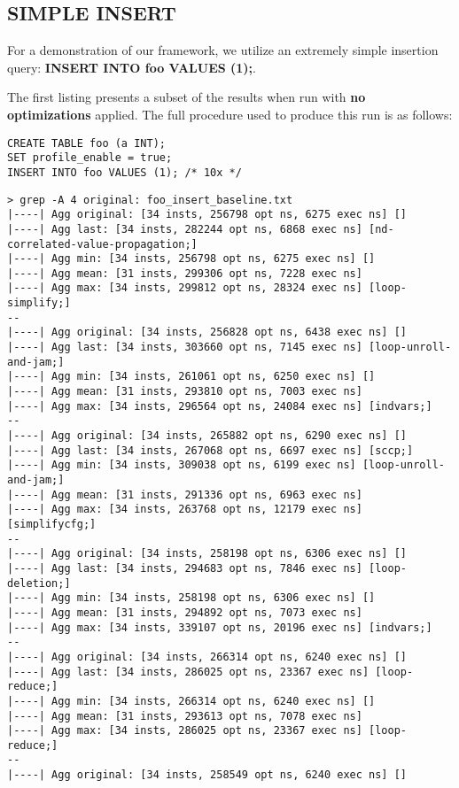 \documentclass{vldb}
\newcommand{\dbCode}[1]{{\sffamily\small \textbf{#1}}\xspace}
\begin{document}
\subsection{SIMPLE INSERT}

For a demonstration of our framework, we utilize an extremely simple insertion query: \dbCode{INSERT INTO foo VALUES (1);}.

The first listing presents a subset of the results when run with \textbf{no optimizations} applied. The full procedure used to produce this run is as follows:
\begin{lstlisting}
CREATE TABLE foo (a INT);
SET profile_enable = true;
INSERT INTO foo VALUES (1); /* 10x */
\end{lstlisting}  

\begin{lstlisting}
> grep -A 4 original: foo_insert_baseline.txt 
|----| Agg original: [34 insts, 256798 opt ns, 6275 exec ns] []
|----| Agg last: [34 insts, 282244 opt ns, 6868 exec ns] [nd-correlated-value-propagation;]
|----| Agg min: [34 insts, 256798 opt ns, 6275 exec ns] []
|----| Agg mean: [31 insts, 299306 opt ns, 7228 exec ns]
|----| Agg max: [34 insts, 299812 opt ns, 28324 exec ns] [loop-simplify;]
--
|----| Agg original: [34 insts, 256828 opt ns, 6438 exec ns] []
|----| Agg last: [34 insts, 303660 opt ns, 7145 exec ns] [loop-unroll-and-jam;]
|----| Agg min: [34 insts, 261061 opt ns, 6250 exec ns] []
|----| Agg mean: [31 insts, 293810 opt ns, 7003 exec ns]
|----| Agg max: [34 insts, 296564 opt ns, 24084 exec ns] [indvars;]
--
|----| Agg original: [34 insts, 265882 opt ns, 6290 exec ns] []
|----| Agg last: [34 insts, 267068 opt ns, 6697 exec ns] [sccp;]
|----| Agg min: [34 insts, 309038 opt ns, 6199 exec ns] [loop-unroll-and-jam;]
|----| Agg mean: [31 insts, 291336 opt ns, 6963 exec ns]
|----| Agg max: [34 insts, 263768 opt ns, 12179 exec ns] [simplifycfg;]
--
|----| Agg original: [34 insts, 258198 opt ns, 6306 exec ns] []
|----| Agg last: [34 insts, 294683 opt ns, 7846 exec ns] [loop-deletion;]
|----| Agg min: [34 insts, 258198 opt ns, 6306 exec ns] []
|----| Agg mean: [31 insts, 294892 opt ns, 7073 exec ns]
|----| Agg max: [34 insts, 339107 opt ns, 20196 exec ns] [indvars;]
--
|----| Agg original: [34 insts, 266314 opt ns, 6240 exec ns] []
|----| Agg last: [34 insts, 286025 opt ns, 23367 exec ns] [loop-reduce;]
|----| Agg min: [34 insts, 266314 opt ns, 6240 exec ns] []
|----| Agg mean: [31 insts, 293613 opt ns, 7078 exec ns]
|----| Agg max: [34 insts, 286025 opt ns, 23367 exec ns] [loop-reduce;]
--
|----| Agg original: [34 insts, 258549 opt ns, 6240 exec ns] []

\end{lstlisting}
\end{document}
